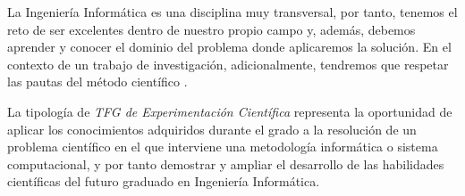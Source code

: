 La Ingeniería Informática es una disciplina muy transversal, por tanto, tenemos el reto de ser excelentes dentro de nuestro propio campo y, además, debemos aprender y conocer el dominio del problema donde aplicaremos la solución. En el contexto de un trabajo de investigación, adicionalmente, tendremos que respetar las pautas del método científico \cite{Chalmers2013}. 


La tipología de {\it TFG de Experimentación Científica} representa la oportunidad de aplicar los conocimientos adquiridos durante el grado a la resolución de un problema científico en el que interviene una metodología informática o sistema computacional, y por tanto demostrar y ampliar el desarrollo de las habilidades científicas del futuro graduado en Ingeniería Informática.

